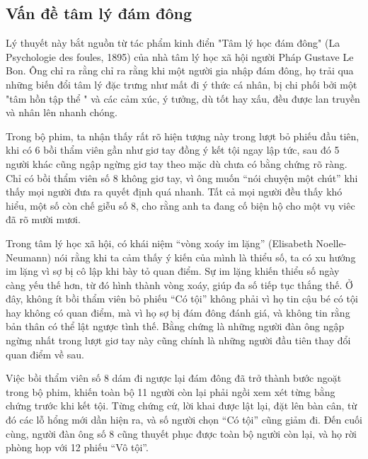 \documentclass[12pt,a4paper]{article}
\begin{document}
\subsection{Vấn đề tâm lý đám đông}

Lý thuyết này bắt nguồn từ tác phẩm kinh điển "Tâm lý học đám đông" (La Psychologie des foules, 1895)
của nhà tâm lý học xã hội người Pháp Gustave Le Bon. Ông chỉ ra rằng chỉ ra rằng khi một người gia nhập đám đông,
họ trải qua những biến đổi tâm lý đặc trưng như mất đi ý thức cá nhân, bị chi phối bởi một "tâm hồn tập thể "
và các cảm xúc, ý tưởng, dù tốt hay xấu, đều được lan truyền và nhân lên nhanh chóng.


Trong bộ phim, ta nhận thấy rất rõ hiện tượng này trong lượt bỏ phiếu đầu tiên, khi có 6 bồi thẩm viên
gần như giơ tay đồng ý kết tội ngay lập tức, sau đó 5 người khác cũng ngập ngừng giơ tay theo mặc dù chưa có bằng chứng rõ ràng.
Chỉ có bồi thẩm viên số 8 không giơ tay, vì ông muốn ``nói chuyện một chút'' khi thấy mọi người đưa ra quyết định quá nhanh.
Tất cả mọi người đều thấy khó hiểu, một số còn chế giễu số 8, cho rằng anh ta đang cố biện hộ cho một vụ viêc
đã rõ mười mươi.

Trong tâm lý học xã hội, có khái niệm ``vòng xoáy im lặng'' (Elisabeth Noelle-Neumann) nói rằng khi ta cảm thấy ý kiến của mình là thiểu số, ta có xu hướng im lặng vì sợ bị cô lập
khi bày tỏ quan điểm. Sự im lặng khiến thiểu số ngày càng yếu thế hơn, từ đó hình thành vòng xoáy, giúp đa số tiếp tục thắng thế.
Ở đây, không ít bồi thẩm viên bỏ phiếu ``Có tội'' không phải vì họ tin cậu bé có tội hay không có quan điểm, mà vì họ sợ bị đám đông đánh giá, và không tin rằng bản thân
có thể lật ngược tình thế. Bằng chứng là những người đàn ông ngập ngừng nhất trong lượt giơ tay này cũng chính là những người đầu tiên thay đổi quan điểm về sau.

Việc bồi thẩm viên số 8 dám đi ngược lại đám đông đã trở thành bước ngoặt trong bộ phim, khiến toàn bộ 11 người còn lại phải ngồi xem xét từng bằng chứng trước khi kết tội.
Từng chứng cứ, lời khai được lật lại, đặt lên bàn cân, từ đó các lỗ hổng mới dần hiện ra, và số người chọn ``Có tội'' cũng giảm đi.
Đến cuối cùng, người đàn ông số 8 cũng thuyết phục được toàn bộ người còn lại, và họ rời phòng họp với 12 phiếu ``Vô tội''.
\end{document}
